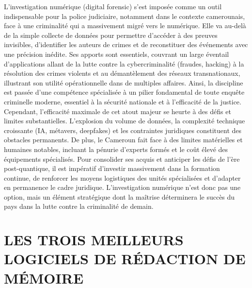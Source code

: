 \documentclass[12pt, openany]{report}
\begin{document}
L'investigation numérique (digital forensic) s'est imposée comme un outil indispensable pour la police judiciaire, notamment dans le contexte camerounais, face à une criminalité qui a massivement migré vers le numérique. Elle va au-delà de la simple collecte de données pour permettre d'accéder à des preuves invisibles, d'identifier les auteurs de crimes et de reconstituer des événements avec une précision inédite. Ses apports sont essentiels, couvrant un large éventail d'applications allant de la lutte contre la cybercriminalité (fraudes, hacking) à la résolution des crimes violents et au démantèlement des réseaux transnationaux, illustrant son utilité opérationnelle dans de multiples affaires. Ainsi, la discipline est passée d'une compétence spécialisée à un pilier fondamental de toute enquête criminelle moderne, essentiel à la sécurité nationale et à l'efficacité de la justice.\\

Cependant, l'efficacité maximale de cet atout majeur se heurte à des défis et limites substantielles. L'explosion du volume de données, la complexité technique croissante (IA, métavers, deepfakes) et les contraintes juridiques constituent des obstacles permanents. De plus, le Cameroun fait face à des limites matérielles et humaines notables, incluant la pénurie d'experts formés et le coût élevé des équipements spécialisés. Pour consolider ses acquis et anticiper les défis de l'ère post-quantique, il est impératif d'investir massivement dans la formation continue, de renforcer les moyens logistiques des unités spécialisées et d'adapter en permanence le cadre juridique. L'investigation numérique n'est donc pas une option, mais un élément stratégique dont la maîtrise déterminera le succès du pays dans la lutte contre la criminalité de demain.

\newpage
\section{LES TROIS MEILLEURS LOGICIELS DE
RÉDACTION DE MÉMOIRE}
\end{document}
